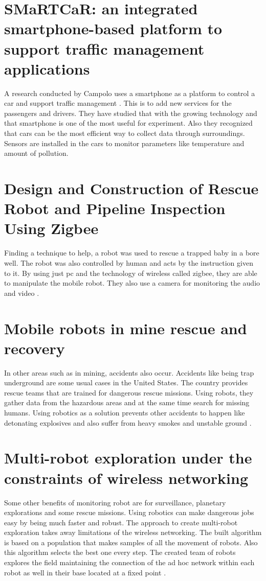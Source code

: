 \section{SMaRTCaR: an integrated smartphone-based platform to support traffic management applications}
A research conducted by Campolo uses a smartphone as a platform to control a car and support traffic management \cite{6398700}. This is to add new services for the passengers and drivers. They have studied that with the growing technology and that smartphone is one of the most useful for experiment. Also they recognized that cars can be the most efficient way to collect data through surroundings. Sensors are installed in the cars to monitor parameters like temperature and amount of pollution. 

\section{Design and Construction of Rescue Robot and Pipeline Inspection Using Zigbee}
Finding a technique to help, a robot was used to rescue a trapped baby in a bore well. The robot was also controlled by human and acts by the instruction given to it. By using just pc and the technology of wireless called zigbee, they are able to manipulate the mobile robot. They also use a camera for monitoring the audio and video \cite{Bharathi2013}.

\section{Mobile robots in mine rescue and recovery}
In other areas such as in mining, accidents also occur. Accidents like being trap underground are some usual cases in the United States. The country provides rescue teams that are trained for dangerous rescue missions. Using robots, they gather data from the hazardous areas and at the same time search for missing humans. Using robotics as a solution prevents other accidents to happen like detonating explosives and also suffer from heavy smokes and unstable ground \cite{5069840}.

\section{Multi-robot exploration under the constraints of wireless networking}
Some other benefits of monitoring robot are for surveillance, planetary explorations and some rescue missions. Using robotics can make dangerous jobs easy by being much faster and robust. The approach to create multi-robot exploration takes away limitations of the wireless networking. The built algorithm is based on a population that makes samples of all the movement of robots. Also this algorithm selects the best one every step. The created team of robots explores the field maintaining the connection of the ad hoc network within each robot as well in their base located at a fixed point \cite{Rooker2007}.

